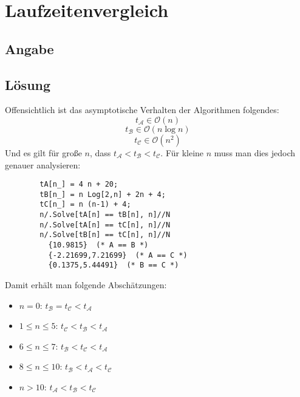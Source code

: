 \section*{Laufzeitenvergleich}
\subsection*{Angabe}


\subsection*{Lösung}

\begin{flushenum}
\item
	Offensichtlich ist das asymptotische Verhalten der Algorithmen folgendes:
	\[ t_\mathcal{A} \in \mathcal{O}(n) \]
	\[ t_\mathcal{B} \in \mathcal{O}(n \log n) \]
	\[ t_\mathcal{C} \in \mathcal{O}(n^2) \]
	Und es gilt für große $n$, dass $t_\mathcal{A} < t_\mathcal{B} < t_\mathcal{C}$.
	Für kleine $n$ muss man dies jedoch genauer analysieren:
	\lstset{language=Mathematica}
	\begin{lstlisting}
		tA[n_] = 4 n + 20;
		tB[n_] = n Log[2,n] + 2n + 4;
		tC[n_] = n (n-1) + 4;
		n/.Solve[tA[n] == tB[n], n]//N
		n/.Solve[tA[n] == tC[n], n]//N
		n/.Solve[tB[n] == tC[n], n]//N
		  {10.9815}  (* A == B *)
		  {-2.21699,7.21699}  (* A == C *)
		  {0.1375,5.44491}  (* B == C *)
	\end{lstlisting}
	Damit erhält man folgende Abschätzungen:
	\begin{itemize}
		\item $n=0$: $t_\mathcal{B} = t_\mathcal{C} < t_\mathcal{A}$
		\item $1 \leq n \leq 5$: $t_\mathcal{C} < t_\mathcal{B} < t_\mathcal{A}$
		\item $6 \leq n \leq 7$: $t_\mathcal{B} < t_\mathcal{C} < t_\mathcal{A}$
		\item $8 \leq n \leq 10$: $t_\mathcal{B} < t_\mathcal{A} < t_\mathcal{C}$
		\item $n > 10$: $t_\mathcal{A} < t_\mathcal{B} < t_\mathcal{C}$
	\end{itemize}


\end{flushenum}
